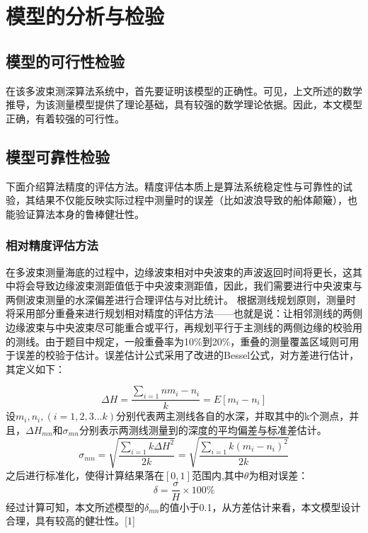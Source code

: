 \documentclass[withoutpreface,bwprint]{cumcmthesis} %
\begin{document}
\section{模型的分析与检验}
\subsection{模型的可行性检验}
在该多波束测深算法系统中，首先要证明该模型的正确性。可见，上文所述的数学推导，为该测量模型提供了理论基础，具有较强的数学理论依据。因此，本文模型正确，有着较强的可行性。
\subsection{模型可靠性检验}
下面介绍算法精度的评估方法。精度评估本质上是算法系统稳定性与可靠性的试验，其结果不仅能反映实际过程中测量时的误差（比如波浪导致的船体颠簸），也能验证算法本身的鲁棒健壮性。
\subsubsection{相对精度评估方法}
在多波束测量海底的过程中，边缘波束相对中央波束的声波返回时间将更长，这其中将会导致边缘波束测距值低于中央波束测距值，因此，我们需要进行中央波束与两侧波束测量的水深偏差进行合理评估与对比统计。
根据测线规划原则，测量时将采用部分重叠来进行规划相对精度的评估方法——也就是说：让相邻测线的两侧边缘波束与中央波束尽可能重合或平行，再规划平行于主测线的两侧边缘的校验用的测线。由于题目中规定，一般重叠率为10\%到20\%，重叠的测量覆盖区域则可用于误差的校验于估计。误差估计公式采用了改进的Bessel公式，对方差进行估计，其定义如下：

\begin{equation}
\Delta H=\frac{\sum_{i=1}{n}{m_i-n_i}}{k}=E[m_i-n_i]
\end{equation}
设$m_i, n_i,(i=1, 2, 3...k)$分别代表两主测线各自的水深，并取其中的k个测点，并且，$\Delta H_{mn}$和$\sigma_{mn}$分别表示两测线测量到的深度的平均偏差与标准差估计。
\begin{equation}
\sigma_{mn}=\sqrt{\frac{\sum_{i=1}{k}{\Delta H^2}}{2k}}=\sqrt{\frac{\sum_{i=1}{k}{(m_i-n_i)^2}}{2k}}
\end{equation}
之后进行标准化，使得计算结果落在$[0,1]$范围内,其中$\theta$为相对误差：
\begin{equation}
\delta=\frac{\sigma}{H}\times 100\%
\end{equation}
经过计算可知，本文所述模型的$\delta_{mn}$的值小于0.1，从方差估计来看，本文模型设计合理，具有较高的健壮性。[1]
\end{document}
